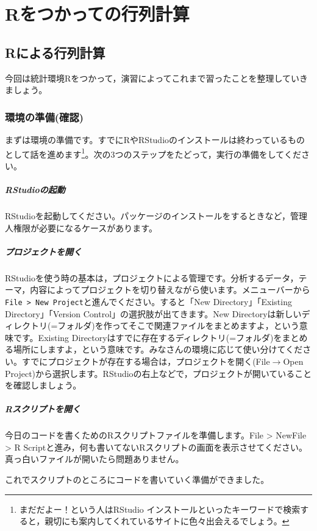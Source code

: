 \documentclass{ltjsbook}
\begin{document}
\chapter{Rをつかっての行列計算}
\label{x09_matrixOnR}
\section{Rによる行列計算}

今回は統計環境Rをつかって，演習によってこれまで習ったことを整理していきましょう。
\subsection{環境の準備(確認)}
まずは環境の準備です。すでにRやRStudioのインストールは終わっているものとして話を進めます\footnote{まだだよー！という人はRStudio インストールといったキーワードで検索すると，親切にも案内してくれているサイトに色々出会えるでしょう。}。次の3つのステップをたどって，実行の準備をしてください。
\paragraph{RStudioの起動}RStudioを起動してください。パッケージのインストールをするときなど，管理人権限が必要になるケースがあります。
\paragraph{プロジェクトを開く}\label{UnderProject}RStudioを使う時の基本は，プロジェクトによる管理です。分析するデータ，テーマ，内容によってプロジェクトを切り替えながら使います。メニューバーから\verb|File > New Project|と進んでください。すると「New Directory」「Existing Directory」「Version Control」の選択肢が出てきます。New Directoryは新しいディレクトリ(=フォルダ)を作ってそこで関連ファイルをまとめますよ，という意味です。Existing Directoryはすでに存在するディレクトリ(=フォルダ)をまとめる場所にしますよ，という意味です。みなさんの環境に応じて使い分けてください。すでにプロジェクトが存在する場合は，プロジェクトを開く(File$\to$Open Project)から選択します。RStudioの右上などで，プロジェクトが開いていることを確認しましょう。
\paragraph{Rスクリプトを開く}今日のコードを書くためのRスクリプトファイルを準備します。File > NewFile > R Scriptと進み，何も書いてないRスクリプトの画面を表示させてください。真っ白いファイルが開いたら問題ありません。

これでスクリプトのところにコードを書いていく準備ができました。
\end{document}
